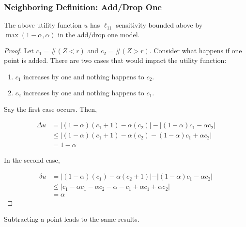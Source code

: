 \documentclass[11pt]{scrartcl} %
\begin{document}
\subsubsection{Neighboring Definition: Add/Drop One}

\begin{lemma}
The above utility function $u$ has $\ell_11$ sensitivity bounded above by $\max(1-\alpha, \alpha)$ in the add/drop one model.
\end{lemma}

\begin{proof}
Let $c_1 = \#(Z<r)$ and $c_2 = \#(Z>r)$.  Consider what happens if one point is added. There are two cases that would impact the utility function: 
\begin{enumerate}
\item $c_1$ increases by one and nothing happens to $c_2$.
\item $c_2$ increases by one and nothing happens to $c_1$.
\end{enumerate}

Say the first case occurs. Then,

\begin{align*}
\Delta u &= | (1-\alpha) (c_1 + 1) - \alpha (c_2) | - | (1-\alpha) c_1 - \alpha c_2 |  \\
 	&\le | (1-\alpha) (c_1 + 1) - \alpha (c_2) - (1-\alpha) c_1 + \alpha c_2 | \\
	&= 1 - \alpha
\end{align*}

In the second case,

\begin{align*}
\delta u &= \vert (1-\alpha) (c_1) - \alpha (c_2 + 1) \vert - \vert (1-\alpha) c_1 - \alpha c_2 \vert \\
	&\le \vert c_1 -\alpha c_1 - \alpha c_2 - \alpha - c_1 + \alpha c_1 + \alpha c_2  \vert\\
	&= \alpha 
\end{align*}
\end{proof}

Subtracting a point leads to the same results. 


\nocite{*}

\end{document}
